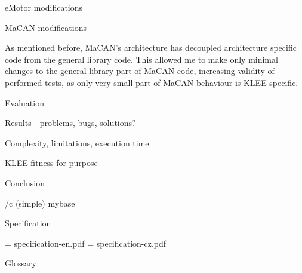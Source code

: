 \sec eMotor modifications


\sec MaCAN modifications

As mentioned before, MaCAN's architecture has decoupled architecture specific
code from the general library code. This allowed me to make only minimal
changes to the general library part of MaCAN code, increasing validity of
performed tests, as only very small part of MaCAN behaviour is KLEE specific.


\chap Evaluation

\sec Results - problems, bugs, solutions?


\sec Complexity, limitations, execution time

\sec KLEE fitness for purpose

\chap Conclusion



\bibchap
\usebib/c (simple) mybase


\app Specification

\picw=\hsize
\cinspic specification-en.pdf
\vfil\break
\picw=\hsize
\cinspic specification-cz.pdf

\nextoddpage


\app Glossary\par
\makeglos

\nextoddpage

\bye

